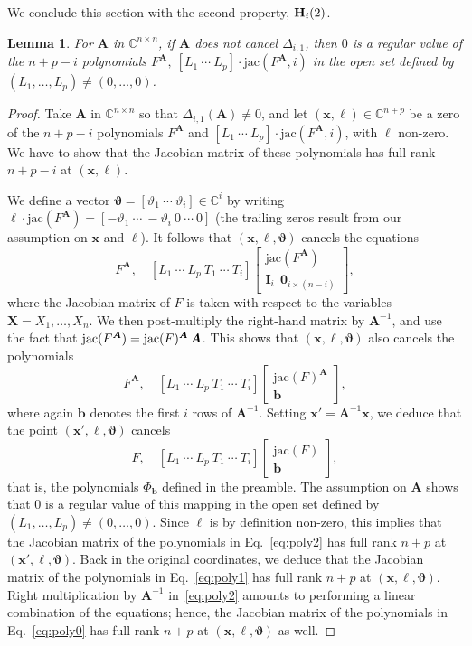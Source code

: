 \documentclass[12pt]{article}
\def\thetab{\bm{\vartheta}}
\def\mA{{\bm A}}
\def\xb{{\bm x}}
\def\D{\Delta}
\def\C{\mathbb{C}}
\def\bbm{\begin{bmatrix}}
\def\ebm{\end{bmatrix}}
\newtheorem{lemma}[theorem]{Lemma}
\begin{document}
We conclude this section with the second property, ${\bf H}_i(2)$.
\begin{lemma}
  For $\mA$ in $\C^{n\times n}$, if $\mA$ does not cancel $\D_{i,1}$,
  then $0$ is a regular value of the $n+p-i$ polynomials
  $F^\mA,\ [L_1~\cdots~L_p]\cdot \mathrm {jac}(F^\mA,i)$ in the open
  set defined by $(L_1,\dots,L_p) \ne (0,\dots,0)$.
\end{lemma}
\begin{proof}
  Take $\mA$ in $\C^{n \times n}$ so that $\Delta_{i,1}(\mA) \not =
  0$, and let $(\xb,\bm\ell) \in \C^{n+p}$ be a zero of the $n+p-i$
  polynomials $F^\mA$ and $[L_1~\cdots~L_p]\cdot \mathrm {jac}(F^\mA,i)$,
  with $\bm \ell$ non-zero. We have to show that the Jacobian matrix
  of these polynomials has full rank $n+p-i$ at $(\xb,\bm\ell)$.

  We define a vector $\thetab = [\vartheta_1 ~\cdots~\vartheta_i] \in
  \C^i$ by writing $\bm \ell \cdot \mathrm{jac}(F^\mA) = [
    -\vartheta_1 ~\cdots~-\vartheta_i ~0~\cdots~0 ]$ (the trailing
  zeros result from our assumption on $\xb$ and $\bm\ell$). It
  follows that $(\xb,\bm \ell,\thetab)$ cancels the equations
  \begin{equation}\label{eq:poly0}
  F^\mA, \quad [L_1 ~\cdots~ L_p~ T_1 ~\cdots~ T_i] \bbm \mathrm{jac}(F^\mA) \\ \bm I_i~~\bm 0_{i \times (n-i)} \ebm,
  \end{equation}
  where the Jacobian matrix of $F$ is taken with respect to the
  variables $\bm X= X_1,\dots,X_n$. We then post-multiply the
  right-hand matrix by $\mA^{-1}$, and use the fact that ${\rm
    jac}(F^\mA) = {\rm jac}(F)^\mA \, \mA$.  This shows that $(\xb,\bm
  \ell,\thetab)$ also cancels the polynomials
  \begin{equation}\label{eq:poly1}
  F^\mA, \quad [L_1 ~\cdots~ L_p~ T_1 ~\cdots~ T_i] \bbm \mathrm{jac}(F)^\mA \\ \bm b  \ebm,    
  \end{equation}
  where again $\bm b$ denotes the first $i$ rows of $\mA^{-1}$.
  Setting $\xb'=\mA^{-1} \xb$, we deduce that the point $(\xb',\bm\ell,\thetab)$ 
  cancels 
  \begin{equation}\label{eq:poly2}
    F, \quad [L_1 ~\cdots~ L_p~ T_1 ~\cdots~ T_i] \bbm \mathrm{jac}(F) \\ \bm b  \ebm,    
  \end{equation}
  that is, the polynomials $\Phi_{\bm b}$ defined in the preamble.
  The assumption on $\mA$ shows that $0$ is a regular value of this
  mapping in the open set defined by $(L_1,\dots,L_p) \ne
  (0,\dots,0)$.  Since $\bm \ell$ is by definition non-zero, this
  implies that the Jacobian matrix of the polynomials in
  Eq.~\eqref{eq:poly2} has full rank $n+p$ at
  $(\xb',\bm\ell,\thetab)$. Back in the original coordinates, we
  deduce that the Jacobian matrix of the polynomials in
  Eq.~\eqref{eq:poly1} has full rank $n+p$ at
  $(\xb,\bm\ell,\thetab)$. Right multiplication by $\mA^{-1}$
  in~\eqref{eq:poly2} amounts to performing a linear combination of
  the equations; hence, the Jacobian matrix of the polynomials in
  Eq.~\eqref{eq:poly0} has full rank $n+p$ at $(\xb,\bm\ell,\thetab)$
  as well.


\end{proof}
\end{document}
